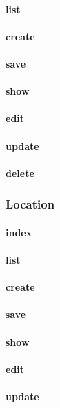 \documentclass[12pt]{article}
\begin{document}
\paragraph{list}
\paragraph{create}
\paragraph{save}
\paragraph{show}
\paragraph{edit}
\paragraph{update}
\paragraph{delete}

\subsubsection{Location}
\paragraph{index}
\paragraph{list}
\paragraph{create}
\paragraph{save}
\paragraph{show}
\paragraph{edit}
\paragraph{update}
\end{document}

